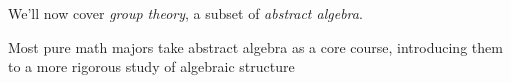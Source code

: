 \documentclass[12pt,oneside,oldfontcommands]{memoir}
\theoremstyle{definition}
\begin{document}
\begin{Subsection}[1.3- TD/Q Learning]
\end{Subsection}



\begin{Section}
We'll now cover \textit{group theory}, a subset of \textit{abstract algebra}.

\tcblower 

Most pure math majors take abstract algebra as a core course, introducing them to a more rigorous study of algebraic structure 
\end{Section}


\printbibliography
\end{document}
